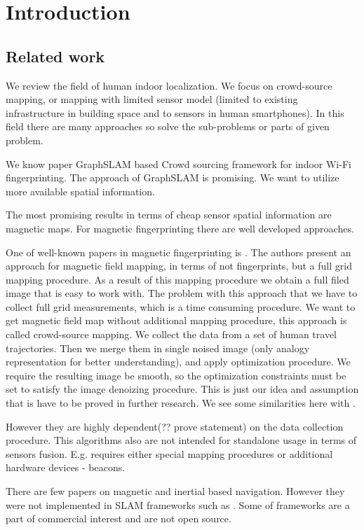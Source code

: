 \documentclass[a4paper, 12pt]{article}
\begin{document}
\section{Introduction}

\subsection{Related work}

We review the field of human indoor localization. We focus on crowd-source mapping, or mapping with limited sensor model (limited to existing infrastructure in building space and to sensors in human smartphones).
In this field there are many approaches so solve the sub-problems or parts of given problem. 

We know paper GraphSLAM based Crowd sourcing framework for indoor Wi-Fi fingerprinting\cite{7809951}. The approach of GraphSLAM is promising. We want to utilize more available spatial information.

The most promising results in terms of cheap sensor spatial information are magnetic maps. For magnetic fingerprinting there are well developed approaches.

One of well-known papers in magnetic fingerprinting is \cite{Grand20123AxisMF}. The authors present an approach for magnetic field mapping, in terms of not fingerprints, but a full grid mapping procedure. As a result of this mapping procedure we obtain a full filed image that is easy to work with.
The problem with this approach that we have to collect full grid measurements, which is a time consuming procedure. We want to get magnetic field map without additional mapping procedure, this approach is called crowd-source mapping. We collect the data from a set of human travel trajectories. Then we merge them in single noised image (only analogy representation for better understanding), and apply optimization procedure. We require the resulting image be smooth, so the optimization constraints must be set to satisfy the image denoizing procedure. This is just our idea and assumption that is have to be proved in further research.
We see some similarities here with \cite{6827640}.

However they are highly dependent(?? prove statement) on the data collection procedure. This algorithms also are not intended for standalone usage in terms of sensors fusion. E.g. requires either special mapping procedures or additional hardware devices - beacons.

There are few papers on magnetic and inertial based navigation. However they were not implemented in SLAM frameworks such as \cite{7809951}. Some of frameworks are a part of commercial interest and are not open source.
\end{document}
